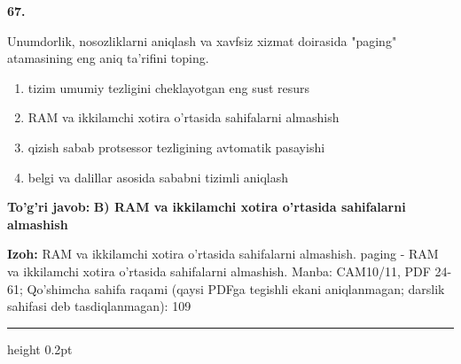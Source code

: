 \documentclass[10pt,a4paper]{article}
\begin{document}
{\bfseries\sffamily\color{ink} 67.}
\par
Unumdorlik, nosozliklarni aniqlash va xavfsiz xizmat doirasida "paging" atamasining eng aniq ta'rifini toping.
\begin{enumerate}[label=\Alph*),leftmargin=9mm]
\item tizim umumiy tezligini cheklayotgan eng sust resurs
\item RAM va ikkilamchi xotira o'rtasida sahifalarni almashish
\item qizish sabab protsessor tezligining avtomatik pasayishi
\item belgi va dalillar asosida sababni tizimli aniqlash
\end{enumerate}
\begin{tcolorbox}[enhanced,breakable,colback=teal!4,colframe=teal!60!black,boxrule=0.45pt,arc=1.2mm,left=2.7mm,right=2.7mm,top=1.8mm,bottom=1.8mm,before skip=2mm,after skip=2mm]
{\bfseries\sffamily\color{teal}To'g'ri javob:} \textbf{B) RAM va ikkilamchi xotira o'rtasida sahifalarni almashish}
\par\smallskip
{\bfseries Izoh:} RAM va ikkilamchi xotira o'rtasida sahifalarni almashish. paging - RAM va ikkilamchi xotira o'rtasida sahifalarni almashish. Manba: CAM10/11, PDF 24-61; Qo'shimcha sahifa raqami (qaysi PDFga tegishli ekani aniqlanmagan; darslik sahifasi deb tasdiqlanmagan): 109
\end{tcolorbox}
\vspace{2mm}\hrule height 0.2pt\vspace{3mm}
\end{document}
